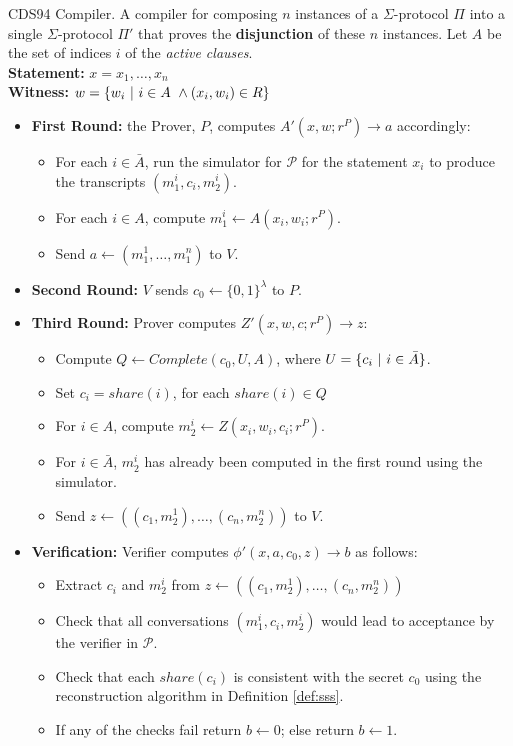 \begin{protocol}[label={prot:cds-compiler}]{CDS94 Compiler. A compiler for composing $n$ instances of a $\Sigma$-protocol $\Pi$ into a single $\Sigma$-protocol $\Pi'$ that proves the \textbf{disjunction} of these $n$ instances.}
    Let $A$ be the set of indices $i$ of the \textit{active clauses}. \\
    \textbf{Statement:} $x = x_1,\ldots, x_n$ \\
    \textbf{Witness:} $w = \{w_i\ \vert\  i \in A\ \land (x_i, w_i) \in R\}$
    \begin{itemize}
        \item \textbf{First Round:} the Prover, $P$, computes $A'(x,w; r^P) \rightarrow a$ accordingly:
        \begin{itemize}
            \item For each $i \in \bar A$, run the simulator for $\mathcal P$ for the statement $x_i$ to produce the transcripts $(m_1^i, c_i, m_2^i)$.
            \item For each $i \in A$, compute $m_1^i \leftarrow A(x_i, w_i; r^P)$.
            \item Send $a \leftarrow (m_1^1, \ldots, m_1^n)$ to $V$.
        \end{itemize}
        \item \textbf{Second Round:} $V$ sends $c_0 \leftarrow \{0,1\}^\lambda$ to $P$. 
        \item \textbf{Third Round:} Prover computes $Z'(x,w,c;r^P) \rightarrow z$:
        \begin{itemize}
            \item Compute $Q \leftarrow Complete(c_0, U, A)$, where $U = \{c_i\ \vert\  i \in \bar A\}$.
            \item Set $c_i = share(i)$, for each $share(i) \in Q$
            \item For $i \in A$, compute $m_2^i \leftarrow Z(x_i, w_i, c_i; r^P)$. 
            \item For $i \in \bar A$, $m_2^i$ has already been computed in the first round using the simulator.
            \item Send $z \leftarrow ((c_1, m_2^1), \ldots, (c_n,m_2^n))$ to $V$.
        \end{itemize}
        \item \textbf{Verification:} Verifier computes $\phi'(x,a,c_0,z) \rightarrow b$ as follows:
        \begin{itemize}
            \item Extract $c_i$ and $m_2^i$ from $z \leftarrow ((c_1, m_2^1), \ldots, (c_n,m_2^n))$
            \item Check that all conversations $(m_1^i, c_i, m_2^i)$ would lead to acceptance by the verifier in $\mathcal P$.
            \item Check that each $share(c_i)$ is consistent with the secret $c_0$ using the reconstruction algorithm in Definition \ref{def:sss}.
            \item If any of the checks fail return $b \leftarrow 0$; else return $b \leftarrow 1$.
        \end{itemize}
    \end{itemize}
\end{protocol}

